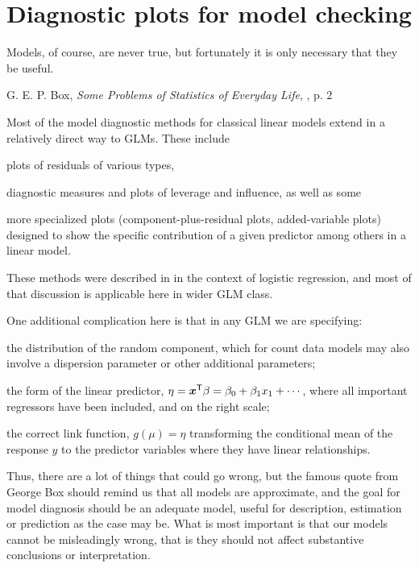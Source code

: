 \documentclass[11pt]{book}\usepackage[]{graphicx}\usepackage[]{color}
\begin{document}
\section{Diagnostic plots for model checking}\label{sec:glm-diag}

\epigraph{Models, of course, are never true, but fortunately it is only necessary that they be useful.}{G. E. P. Box,
\emph{Some Problems of Statistics of Everyday Life}, \citeyear{Box:1979}, p. 2}

Most of the model diagnostic methods for classical linear models extend in a relatively direct way
to GLMs.
These include
\begin{seriate}
  \item plots of residuals of various types,
  \item diagnostic measures and plots of leverage and influence,
as well as some
  \item more specialized plots (component-plus-residual plots, added-variable plots)
designed to show the specific contribution of a given predictor among others in a linear model.
\end{seriate}
These methods were described in  in the context of logistic regression,
and most of that discussion is applicable here in wider GLM class.

One additional complication here is that in any GLM we are specifying:
\begin{seriate}
  \item the distribution of the random component, which for count data models may also involve a dispersion
  parameter or other additional parameters;
  \item the form of the linear predictor, $\eta = \bm{x}^\mathsf{T} \beta = \beta_0 + \beta_1 x_1 + \cdots$,
  where all important regressors have been included, and on the right scale;
  \item the correct link function, $g(\mu) = \eta$
  transforming the conditional mean of the response $y$ to the predictor variables where they have linear
  relationships.
\end{seriate}

Thus, there are a lot of things that could go wrong, but the famous quote from George Box should remind us
that all models are approximate, and the goal for model diagnosis should be an adequate model, useful
for description, estimation or prediction as the case may be. What is most important is that our models
cannot be misleadingly wrong, that is they should not affect substantive conclusions or interpretation.
\end{document}
